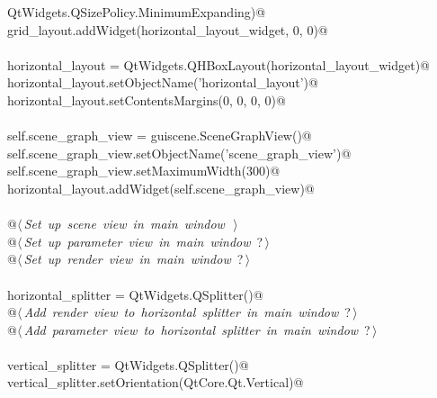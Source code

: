 \documentclass[
    a4paper,      %
    10pt,         %
    openright,    %
    notitlepage,  %
    parskip=half, %
]{scrreprt}       %
\theoremstyle{definition}                    %
\begin{document}
\begin{flushleft}
\begin{minipage}{\linewidth}
\begin{list}{}{}
\mbox{}\lstinline@    QtWidgets.QSizePolicy.MinimumExpanding)@\\
\mbox{}\lstinline@    grid_layout.addWidget(horizontal_layout_widget, 0, 0)@\\
\mbox{}\lstinline@@\\
\mbox{}\lstinline@    horizontal_layout = QtWidgets.QHBoxLayout(horizontal_layout_widget)@\\
\mbox{}\lstinline@    horizontal_layout.setObjectName('horizontal_layout')@\\
\mbox{}\lstinline@    horizontal_layout.setContentsMargins(0, 0, 0, 0)@\\
\mbox{}\lstinline@@\\
\mbox{}\lstinline@    self.scene_graph_view = guiscene.SceneGraphView()@\\
\mbox{}\lstinline@    self.scene_graph_view.setObjectName('scene_graph_view')@\\
\mbox{}\lstinline@    self.scene_graph_view.setMaximumWidth(300)@\\
\mbox{}\lstinline@    horizontal_layout.addWidget(self.scene_graph_view)@\\
\mbox{}\lstinline@@\\
\mbox{}\lstinline@    @\hbox{$\langle\,${\itshape Set up scene view in main window}\nobreak\ {\footnotesize {}}$\,\rangle$}\lstinline@@\\
\mbox{}\lstinline@    @\hbox{$\langle\,${\itshape Set up parameter view in main window}\nobreak\ {\footnotesize ?}$\,\rangle$}\lstinline@@\\
\mbox{}\lstinline@    @\hbox{$\langle\,${\itshape Set up render view in main window}\nobreak\ {\footnotesize ?}$\,\rangle$}\lstinline@@\\
\mbox{}\lstinline@@\\
\mbox{}\lstinline@    horizontal_splitter = QtWidgets.QSplitter()@\\
\mbox{}\lstinline@    @\hbox{$\langle\,${\itshape Add render view to horizontal splitter in main window}\nobreak\ {\footnotesize ?}$\,\rangle$}\lstinline@@\\
\mbox{}\lstinline@    @\hbox{$\langle\,${\itshape Add parameter view to horizontal splitter in main window}\nobreak\ {\footnotesize ?}$\,\rangle$}\lstinline@@\\
\mbox{}\lstinline@@\\
\mbox{}\lstinline@    vertical_splitter = QtWidgets.QSplitter()@\\
\mbox{}\lstinline@    vertical_splitter.setOrientation(QtCore.Qt.Vertical)@\\

\end{list}
\end{minipage}
\end{flushleft}
\end{document}
